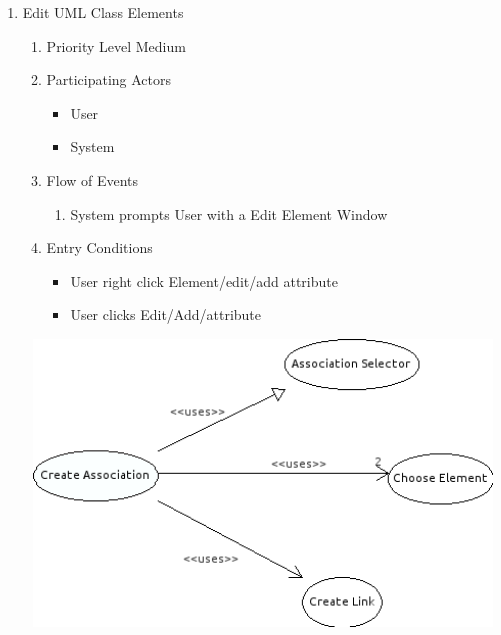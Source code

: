 \documentclass[a4paper, 12pt]{article}
\begin{document}
\begin{enumerate}
\item Edit UML Class Elements
  \begin {enumerate}
  \item Priority Level Medium
  \item Participating Actors
    \begin {itemize}
    \item User
    \item System
    \end {itemize}
  \item Flow of Events
    \begin {enumerate}
    \item System prompts User with a Edit Element Window
    \end {enumerate}
  \item Entry Conditions
    \begin {itemize}
    \item User right click Element/edit/add attribute
    \item User clicks Edit/Add/attribute
    \end {itemize}
  \end {enumerate}

  \begin {center}
    \includegraphics[height=3in, width=5in]{img/CreateAssociation.png}
  \end {center}


\end{enumerate}
\end{document}
